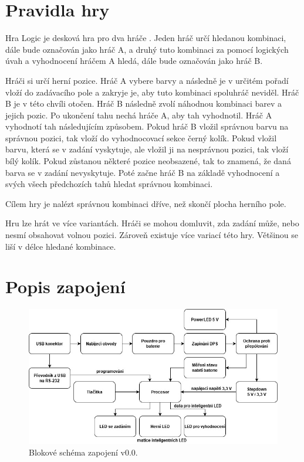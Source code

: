 \chapter{Pravidla hry}
Hra Logic je desková hra pro dva hráče \cite{Logic_pravidla}. Jeden hráč určí hledanou kombinaci, dále bude označován jako 
hráč A, a druhý tuto kombinaci za pomocí logických úvah a
vyhodnocení hráčem A hledá, dále bude označován jako hráč B.

Hráči si určí herní pozice. Hráč A vybere barvy a následně je v určitém pořadí vloží do zadávacího pole a zakryje je, aby tuto
kombinaci spoluhráč neviděl. Hráč B je v této chvíli otočen. Hráč B následně zvolí náhodnou kombinaci barev a jejich pozic. Po 
ukončení tahu nechá
hráče A, aby tah vyhodnotil. Hráč A vyhodnotí tah následujícím způsobem. Pokud hráč B vložil správnou barvu na správnou pozici, tak vloží 
do vyhodnocovací sekce černý kolík. Pokud vložil barvu, která se v zadání vyskytuje, ale vložil ji na nesprávnou pozici, tak vloží bílý kolík.
Pokud zůstanou některé pozice neobsazené, tak to znamená, že daná barva se v zadání nevyskytuje. Poté začne hráč B na základě vyhodnocení a 
svých všech předchozích tahů hledat správnou kombinaci.

Cílem hry je nalézt správnou kombinaci dříve, než skončí plocha herního pole.

Hru lze hrát ve více variantách. Hráči se mohou domluvit, zda zadání může, nebo nesmí obsahovat volnou pozici. Zároveň existuje 
více variací této hry. Většinou se liší v délce hledané kombinace.

\chapter{Popis zapojení}

\begin{figure}[!h]
  \begin{center}
    \includegraphics[scale=0.6]{obrazky/v0_blokove_schema.jpg}
  \end{center}
  \caption[Blokové schéma zapojení v0.0]{Blokové schéma zapojení v0.0.}
\end{figure}

